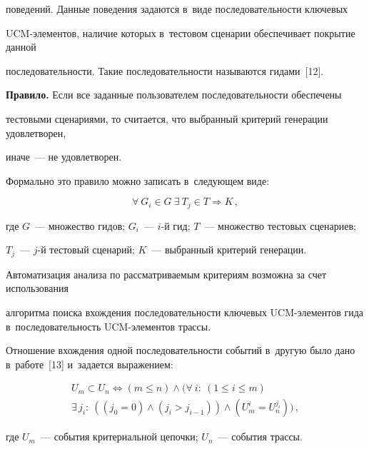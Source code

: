поведений. Данные поведения задаются в~виде последовательности ключевых

  UCM-эле\-мен\-тов, наличие которых в~тестовом сценарии обеспечивает покрытие данной

последовательности. Такие последовательности называются гидами~[12].



  \smallskip



  \noindent

  \textbf{Правило.} Если все заданные пользователем последовательности обеспечены

тестовыми сценариями, то считается, что выбранный критерий генерации удовле\-тво\-рен,

иначе~--- не удовле\-тво\-рен.



  \smallskip



  Формально это правило можно записать в~следующем виде:

  $$

  \forall\ G_i\in {G}\ \exists\ T_j\in T\Rightarrow K\,,

  $$

где $G$~--- множество гидов; $G_i$~--- $i$-й гид; $T$~--- множество тестовых сценариев;

$T_j$~--- $j$-й тестовый сценарий; $K$~--- выбранный критерий генерации.



  Автоматизация анализа по рассматриваемым критериям возможна за счет использования

алгоритма поиска вхождения последовательности ключевых UCM-эле\-мен\-тов гида в~последовательность UCM-эле\-мен\-тов трассы.



  Отношение вхождения одной последовательности событий в~другую было дано в~работе~[13] и~задается выражением:

  \begin{multline*}

  U_m\subset U_n \Leftrightarrow (m\leq n)\wedge  (\forall\ i:\ (1\leq i\leq m)\\

  \exists\, j_i:\ ((j_0=0) \wedge (j_i>j_{i-1})) \wedge (U_m^i=U_n^{j_i}))\,,

  \end{multline*}

где $U_m$~--- события критериальной цепочки; $U_n$~--- события трассы.



